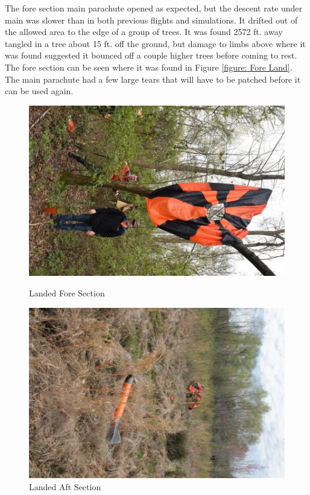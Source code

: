 \documentclass[onecolumn, draftclsnofoot, 10pt, compsoc]{IEEEtran}
\begin{document}
The fore section main parachute opened as expected, but the descent rate under main was slower than in both previous flights and simulations.  It drifted out of the allowed area to the edge of a group of trees.  It was found 2572 ft. away tangled in a tree about 15 ft. off the ground, but damage to limbs above where it was found suggested it bounced off a couple higher trees before coming to rest.  The fore section can be seen where it was found in Figure \ref{figure: Fore Land}.  The main parachute had a few large tears that will have to be patched before it can be used again.

\begin{figure}[H]
    \begin{minipage}{0.5\textwidth}
        \centering
        \includegraphics[width=\textwidth,angle=90]{fore_landing.jpg}
	    \caption{Landed Fore Section}
        \label{figure: Fore Land}
    \end{minipage} \hfill
    \begin{minipage}{0.5\textwidth}	
        \centering
        \includegraphics[width=\textwidth,angle=90]{aft_landing.jpg}
	    \caption{Landed Aft Section}
        \label{figure: Aft Land}
    \end{minipage}
\end{figure}
\end{document}
